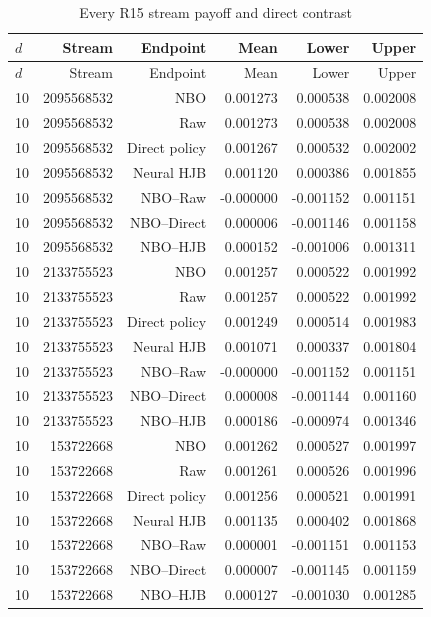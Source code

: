 \begingroup\small
\begin{longtable}{lrrrrr}
\caption{Every R15 stream payoff and direct contrast}\label{tab:r15methodstreams}\\
\toprule
$d$ & Stream & Endpoint & Mean & Lower & Upper \\
\midrule
\endfirsthead
\toprule
$d$ & Stream & Endpoint & Mean & Lower & Upper \\
\midrule
\endhead
10 & 2095568532 & NBO & 0.001273 & 0.000538 & 0.002008 \\
10 & 2095568532 & Raw & 0.001273 & 0.000538 & 0.002008 \\
10 & 2095568532 & Direct policy & 0.001267 & 0.000532 & 0.002002 \\
10 & 2095568532 & Neural HJB & 0.001120 & 0.000386 & 0.001855 \\
10 & 2095568532 & NBO--Raw & -0.000000 & -0.001152 & 0.001151 \\
10 & 2095568532 & NBO--Direct & 0.000006 & -0.001146 & 0.001158 \\
10 & 2095568532 & NBO--HJB & 0.000152 & -0.001006 & 0.001311 \\
10 & 2133755523 & NBO & 0.001257 & 0.000522 & 0.001992 \\
10 & 2133755523 & Raw & 0.001257 & 0.000522 & 0.001992 \\
10 & 2133755523 & Direct policy & 0.001249 & 0.000514 & 0.001983 \\
10 & 2133755523 & Neural HJB & 0.001071 & 0.000337 & 0.001804 \\
10 & 2133755523 & NBO--Raw & -0.000000 & -0.001152 & 0.001151 \\
10 & 2133755523 & NBO--Direct & 0.000008 & -0.001144 & 0.001160 \\
10 & 2133755523 & NBO--HJB & 0.000186 & -0.000974 & 0.001346 \\
10 & 153722668 & NBO & 0.001262 & 0.000527 & 0.001997 \\
10 & 153722668 & Raw & 0.001261 & 0.000526 & 0.001996 \\
10 & 153722668 & Direct policy & 0.001256 & 0.000521 & 0.001991 \\
10 & 153722668 & Neural HJB & 0.001135 & 0.000402 & 0.001868 \\
10 & 153722668 & NBO--Raw & 0.000001 & -0.001151 & 0.001153 \\
10 & 153722668 & NBO--Direct & 0.000007 & -0.001145 & 0.001159 \\
10 & 153722668 & NBO--HJB & 0.000127 & -0.001030 & 0.001285 \\

\end{longtable}

